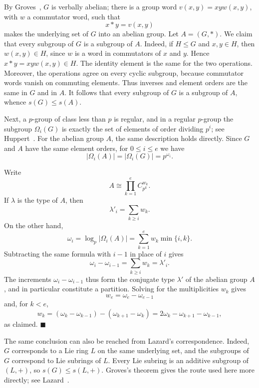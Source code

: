 \documentclass[a4paper,11pt,reqno]{amsart}
\theoremstyle{plain}
\theoremstyle{remark}
\numberwithin{equation}{section}
\newcommand{\card}[1]{\left\lvert #1\right\rvert}
\renewcommand{\leq}{\leqslant}
\renewcommand{\geq}{\geqslant}
\newenvironment{proofof}{{\bf Proof. }}{\hfill $\blacksquare$ \\}
\begin{document}
\begin{proofof}
By Groves~\cite[Th.~2]{Groves}, $G$ is verbally abelian; there is
a group word $v(x,y)=xyw(x,y)$, with $w$ a commutator word, such that
\[
        x*y=v(x,y)
\]
makes the underlying set of $G$ into an abelian group. Let $A=(G,*)$. We
claim that every subgroup of $G$ is a subgroup of $A$. Indeed, if
$H\leq G$ and $x,y\in H$, then $w(x,y)\in H$, since $w$ is a word in
commutators of $x$ and $y$. Hence $x*y=xyw(x,y)\in H$. The identity element is
the same for the two operations. Moreover, the operations agree on every cyclic
subgroup, because commutator words vanish on commuting elements. Thus inverses
and element orders are the same in $G$ and in $A$. It follows that every
subgroup of $G$ is a subgroup of $A$, whence $s(G)\leq s(A)$.

Next, a $p$-group of class less than $p$ is regular, and in a regular
$p$-group the subgroup $\Omega_i(G)$ is exactly the set of elements of order
dividing $p^i$; see Huppert~\cite[Kap.~III, \S 10, Satz~10.2 and
Hauptsatz~10.5]{Huppert}. For the abelian group $A$, the same description holds
directly. Since $G$ and $A$ have the same element orders, for $0\leq i\leq e$ we have
\[
        \card{\Omega_i(A)}=\card{\Omega_i(G)}=p^{\omega_i}.
\]

Write
\[
        A\cong \prod_{k=1}^e C_{p^k}^{w_k}.
\]
If $\lambda$ is the type of $A$, then
\[
        \lambda'_i=\sum_{k\geq i}w_k.
\]
On the other hand,
\[
        \omega_i=\log_p\card{\Omega_i(A)}
        =
        \sum_{k=1}^e w_k\min\{i,k\}.
\]
Subtracting the same formula with $i-1$ in place of $i$ gives
\[
        \omega_i-\omega_{i-1}
        =
        \sum_{k\geq i}w_k
        =
        \lambda'_i.
\]
The increments $\omega_i-\omega_{i-1}$ thus form the conjugate type $\lambda'$
of the abelian group $A$, and in particular constitute a partition. Solving
for the multiplicities $w_k$ gives
\[
        w_e=\omega_e-\omega_{e-1}
\]
and, for $k<e$,
\[
        w_k
        =
        (\omega_k-\omega_{k-1})-(\omega_{k+1}-\omega_k)
        =
        2\omega_k-\omega_{k+1}-\omega_{k-1},
\]
as claimed.
\end{proofof}

The same conclusion can also be reached from Lazard's correspondence. Indeed,
$G$ corresponds to a Lie ring $L$ on the same underlying set, and the subgroups
of $G$ correspond to Lie subrings of $L$. Every Lie subring is an additive
subgroup of $(L,+)$, so $s(G)\leq s(L,+)$. Groves's theorem gives the route
used here more directly; see Lazard~\cite[Chap.~II, Th.~(4.6)]{Lazard}.
\end{document}
